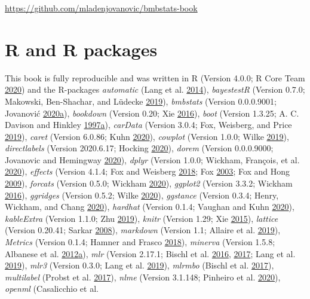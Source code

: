 \documentclass[
]{book}
\begin{document}
\url{https://github.com/mladenjovanovic/bmbstats-book}

\hypertarget{r-and-r-packages}{%
\section*{R and R packages}\label{r-and-r-packages}}

This book is fully reproducible and was written in R (Version 4.0.0; R Core Team \protect\hyperlink{ref-R-base}{2020}) and the R-packages \emph{automatic} (Lang et al. \protect\hyperlink{ref-R-automatic}{2014}), \emph{bayestestR} (Version 0.7.0; Makowski, Ben-Shachar, and Lüdecke \protect\hyperlink{ref-R-bayestestR}{2019}), \emph{bmbstats} (Version 0.0.0.9001; Jovanović \protect\hyperlink{ref-R-bmbstats}{2020}\protect\hyperlink{ref-R-bmbstats}{a}), \emph{bookdown} (Version 0.20; Xie \protect\hyperlink{ref-R-bookdown}{2016}), \emph{boot} (Version 1.3.25; A. C. Davison and Hinkley \protect\hyperlink{ref-R-boot}{1997}\protect\hyperlink{ref-R-boot}{a}), \emph{carData} (Version 3.0.4; Fox, Weisberg, and Price \protect\hyperlink{ref-R-carData}{2019}), \emph{caret} (Version 6.0.86; Kuhn \protect\hyperlink{ref-R-caret}{2020}), \emph{cowplot} (Version 1.0.0; Wilke \protect\hyperlink{ref-R-cowplot}{2019}), \emph{directlabels} (Version 2020.6.17; Hocking \protect\hyperlink{ref-R-directlabels}{2020}), \emph{dorem} (Version 0.0.0.9000; Jovanovic and Hemingway \protect\hyperlink{ref-R-dorem}{2020}), \emph{dplyr} (Version 1.0.0; Wickham, François, et al. \protect\hyperlink{ref-R-dplyr}{2020}), \emph{effects} (Version 4.1.4; Fox and Weisberg \protect\hyperlink{ref-R-effects_a}{2018}; Fox \protect\hyperlink{ref-R-effects_b}{2003}; Fox and Hong \protect\hyperlink{ref-R-effects_c}{2009}), \emph{forcats} (Version 0.5.0; Wickham \protect\hyperlink{ref-R-forcats}{2020}), \emph{ggplot2} (Version 3.3.2; Wickham \protect\hyperlink{ref-R-ggplot2}{2016}), \emph{ggridges} (Version 0.5.2; Wilke \protect\hyperlink{ref-R-ggridges}{2020}), \emph{ggstance} (Version 0.3.4; Henry, Wickham, and Chang \protect\hyperlink{ref-R-ggstance}{2020}), \emph{hardhat} (Version 0.1.4; Vaughan and Kuhn \protect\hyperlink{ref-R-hardhat}{2020}), \emph{kableExtra} (Version 1.1.0; Zhu \protect\hyperlink{ref-R-kableExtra}{2019}), \emph{knitr} (Version 1.29; Xie \protect\hyperlink{ref-R-knitr}{2015}), \emph{lattice} (Version 0.20.41; Sarkar \protect\hyperlink{ref-R-lattice}{2008}), \emph{markdown} (Version 1.1; Allaire et al. \protect\hyperlink{ref-R-markdown}{2019}), \emph{Metrics} (Version 0.1.4; Hamner and Frasco \protect\hyperlink{ref-R-Metrics}{2018}), \emph{minerva} (Version 1.5.8; Albanese et al. \protect\hyperlink{ref-R-minerva}{2012}\protect\hyperlink{ref-R-minerva}{a}), \emph{mlr} (Version 2.17.1; Bischl et al. \protect\hyperlink{ref-R-mlr}{2016}, \protect\hyperlink{ref-R-mlrmbo}{2017}; Lang et al. \protect\hyperlink{ref-R-mlr3}{2019}), \emph{mlr3} (Version 0.3.0; Lang et al. \protect\hyperlink{ref-R-mlr3}{2019}), \emph{mlrmbo} (Bischl et al. \protect\hyperlink{ref-R-mlrmbo}{2017}), \emph{multilabel} (Probst et al. \protect\hyperlink{ref-R-multilabel}{2017}), \emph{nlme} (Version 3.1.148; Pinheiro et al. \protect\hyperlink{ref-R-nlme}{2020}), \emph{openml} (Casalicchio et al. 
\end{document}
